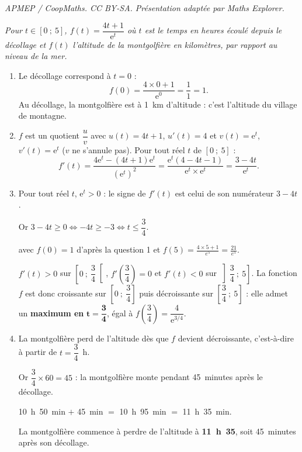 \documentclass[10pt]{article}
\providecommand{\e}{{\mathrm{e}}}
\begin{document}
\noindent\textit{APMEP / CoopMaths. CC BY-SA. Présentation adaptée par Maths Explorer.}\par\medskip
\emph{Pour $t \in [0~;~5]$, $f(t) = \dfrac{4t+1}{\e^t}$ où $t$ est le temps en heures écoulé
depuis le décollage et $f(t)$ l'altitude de la montgolfière en kilomètres, par rapport au
niveau de la mer.}

\begin{enumerate}
	\item Le décollage correspond à $t = 0$ :
	\[f(0) = \dfrac{4 \times 0 + 1}{\e^0} = \dfrac{1}{1} = 1.\]
	Au décollage, la montgolfière est à 1~km d'altitude : c'est l'altitude du village de
	montagne.

	\item $f$ est un quotient $\dfrac{u}{v}$ avec $u(t) = 4t + 1$, $u'(t) = 4$ et $v(t) = \e^t$, $v'(t) = \e^t$
	($v$ ne s'annule pas). Pour tout réel $t$ de $[0~;~5]$ :
	\[f'(t) = \dfrac{4\e^t - (4t+1)\e^t}{\left(\e^t\right)^2}
	= \dfrac{\e^t\left(4 - 4t - 1\right)}{\e^t \times \e^t}
	= \dfrac{3 - 4t}{\e^t}.\]

	\item Pour tout réel $t$, $\e^t > 0$ : le signe de $f'(t)$ est celui de son numérateur $3 - 4t$.

	Or $3 - 4t \geqslant 0 \iff -4t \geqslant -3 \iff t \leqslant \dfrac{3}{4}$.

	\begin{center}
	\end{center}

avec $f(0)=1$ d'après la question 1 et $f(5)=\frac{4\times 5 + 1}{e^5} = \frac{21}{e^5}$.

	$f'(t) > 0$ sur $\left[0~;~\dfrac{3}{4}\right[$, $f'\left(\dfrac{3}{4}\right) = 0$ et
	$f'(t) < 0$ sur $\left]\dfrac{3}{4}~;~5\right]$. La fonction $f$ est donc croissante sur
	$\left[0~;~\dfrac{3}{4}\right]$ puis décroissante sur $\left[\dfrac{3}{4}~;~5\right]$ : elle
	admet un \textbf{maximum en} $\boldsymbol{t = \dfrac{3}{4}}$, égal à
	$f\left(\dfrac{3}{4}\right) = \dfrac{4}{\e^{3/4}}$.

	\item La montgolfière perd de l'altitude dès que $f$ devient décroissante, c'est-à-dire à partir de $t = \dfrac{3}{4}$~h.
	
Or $\dfrac{3}{4} \times 60 = 45$ : la montgolfière monte pendant 45~minutes après le
	décollage.

10~h~50~min $+$ 45~min $=$ 10~h~95~min $=$ 11~h~35~min.

La montgolfière commence à perdre de l'altitude à \textbf{11~h~35}, soit 45~minutes
	après son décollage.
\end{enumerate}
\end{document}
